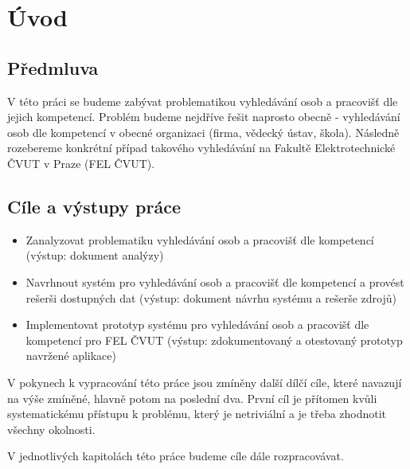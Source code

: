 \chapter{Úvod}
\section{Předmluva}
V této práci se budeme zabývat problematikou vyhledávání osob a pracovišť dle jejich kompetencí.
Problém budeme nejdříve řešit naprosto obecně - vyhledávání osob dle kompetencí v obecné organizaci (firma, vědecký ústav, škola). Následně rozebereme konkrétní případ takového vyhledávání na Fakultě Elektrotechnické ČVUT v Praze (FEL ČVUT).\par
\section{Cíle a výstupy práce}
\begin{itemize}
    \item Zanalyzovat problematiku vyhledávání osob a pracovišť dle kompetencí (výstup: dokument analýzy)
    \item Navrhnout systém pro vyhledávání osob a pracovišť dle kompetencí a provést rešerši dostupných dat (výstup: dokument návrhu systému a rešerše zdrojů)
    \item Implementovat prototyp systému pro vyhledávání osob a pracovišť dle kompetencí pro FEL ČVUT (výstup: zdokumentovaný a otestovaný prototyp navržené aplikace)
\end{itemize}
V pokynech k vypracování této práce jsou zmíněny další dílčí cíle, které navazují na výše zmíněné, hlavně potom na poslední dva. První cíl je přítomen kvůli systematickému přístupu k problému, který je netriviální a je třeba zhodnotit všechny okolnosti.\par
V jednotlivých kapitolách této práce budeme cíle dále rozpracovávat.

